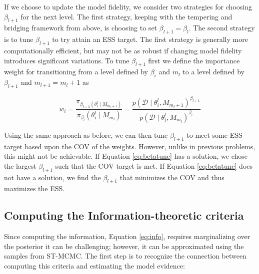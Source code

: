 \documentclass[1p]{article}
\begin{document}
If we choose to update the model fidelity, we consider two strategies for choosing $\beta_{l+1}$ for the next level. The first strategy, keeping with the tempering and bridging framework from above, is choosing to set $\beta_{l+1} = \beta_{l}$. The second strategy is to tune $\beta_{l+1}$ to try attain an ESS target. The first strategy is generally more computationally efficient, but may not be as robust if changing model fidelity introduces significant variations. To tune $\beta_{l+1}$ first we define the importance weight for transitioning from a level defined by $\beta_i$ and $m_{l}$ to a level defined by $\beta_{l+1}$ and $m_{l+1} = m_{l}+1$ as

\begin{equation}
w_i = \frac{\pi_{\beta_{l+1} \left ( \theta_i^{l} \mid M_{m_{l}+1}\right )}}{\pi_{\beta_{l}} \left ( \theta_i^{l} \mid M_{m_{l}} \right )} = \frac{p \left ( \mathcal{D} \mid \theta_i^{l},  M_{m_{l}+1} \right )^{\beta_{l+1}} }{p \left ( \mathcal{D} \mid \theta_i^{l},  M_{m_{l}} \right )^{\beta_{l}} }
\end{equation}

Using the same approach as before, we can then tune $\beta_{l+1}$ to meet some ESS target based upon the COV of the weights. However, unlike in previous problems, this might not be achievable.  If Equation \ref{eq:betatune} has a solution, we chose the largest $\beta_{l+1}$ such that the COV target is met. If Equation \ref{eq:betatune} does not have a solution, we find the $\beta_{l+1}$ that minimizes the COV and thus maximizes the ESS.

\subsection{Computing the Information-theoretic criteria}

Since computing the information, Equation \ref{eq:info}, requires marginalizing over the posterior it can be challenging; however, it can be approximated using the samples from ST-MCMC. The first step is to recognize the connection between computing this criteria and estimating the model evidence:
\end{document}
